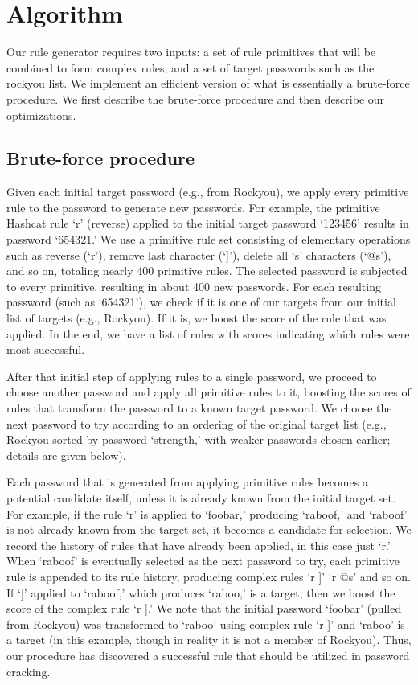\documentclass[letterpaper,twocolumn,10pt]{article}
\begin{document}
\section{Algorithm}
\label{sec:algorithm}

Our rule generator requires two inputs: a set of rule primitives that will be
combined to form complex rules, and a set of target passwords such as the
rockyou list. We implement an efficient version of what is essentially a
brute-force procedure. We first describe the brute-force procedure and then
describe our optimizations.


\subsection{Brute-force procedure}

Given each initial target password (e.g., from Rockyou), we apply every
primitive rule to the password to generate new passwords. For example, the
primitive Hashcat rule `r' (reverse) applied to the initial target password
`123456' results in password `654321.' We use a primitive rule set consisting of
elementary operations such as reverse (`r'), remove last character (`]'), delete
all `s' characters (`@s'), and so on, totaling nearly 400 primitive rules. The
selected password is subjected to every primitive, resulting in about 400 new
passwords. For each resulting password (such as `654321'), we check if it is one
of our targets from our initial list of targets (e.g., Rockyou). If it is, we
boost the score of the rule that was applied. In the end, we have a list of
rules with scores indicating which rules were most successful.

After that initial step of applying rules to a single password, we proceed to
choose another password and apply all primitive rules to it, boosting the scores
of rules that transform the password to a known target password. We choose the
next password to try according to an ordering of the original target list (e.g.,
Rockyou sorted by password `strength,' with weaker passwords chosen earlier;
details are given below).

Each password that is generated from applying primitive rules becomes a
potential candidate itself, unless it is already known from the initial target
set. For example, if the rule `r' is applied to `foobar,' producing `raboof,'
and `raboof' is not already known from the target set, it becomes a candidate
for selection. We record the history of rules that have already been applied, in
this case just `r.' When `raboof' is eventually selected as the next password to
try, each primitive rule is appended to its rule history, producing complex
rules `r ]' `r @s' and so on. If `]' applied to `raboof,' which produces
`raboo,' is a target, then we boost the score of the complex rule `r ].' We note
that the initial password `foobar' (pulled from Rockyou) was transformed to
`raboo' using complex rule `r ]' and `raboo' is a target (in this example,
though in reality it is not a member of Rockyou). Thus, our procedure has
discovered a successful rule that should be utilized in password cracking.
\end{document}
